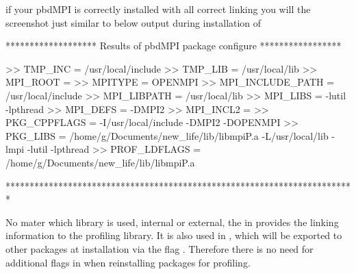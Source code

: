 if your pbdMPI is correctly installed with all correct linking you will the screenshot just similar to below output 
during installation of 
\begin{Output}
******************* Results of pbdMPI package configure *****************
 
>> TMP_INC = /usr/local/include
>> TMP_LIB = /usr/local/lib
>> MPI_ROOT = 
>> MPITYPE = OPENMPI
>> MPI_INCLUDE_PATH = /usr/local/include
>> MPI_LIBPATH = /usr/local/lib
>> MPI_LIBS =  -lutil -lpthread
>> MPI_DEFS = -DMPI2
>> MPI_INCL2 = 
>> PKG_CPPFLAGS = -I/usr/local/include  -DMPI2 -DOPENMPI
>> PKG_LIBS = /home/g/Documents/new_life/lib/libmpiP.a -L/usr/local/lib -lmpi  -lutil -lpthread
>> PROF_LDFLAGS = /home/g/Documents/new_life/lib/libmpiP.a
 
*************************************************************************

\end{Output}

No mater which library is used, internal or external, the 
in  provides the linking information to the
profiling library. It is also used in , which will be
exported to other  packages at installation via the flag
.  Therefore there is no need for additional flags in
 when reinstalling packages for profiling.

